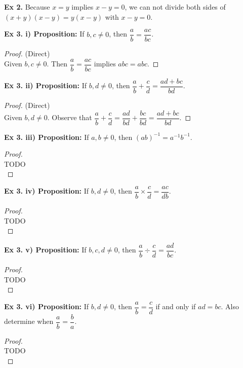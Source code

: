 \documentclass{article}
\begin{document}
	\textbf{Ex 2.} Because $x=y$ implies $x-y=0$, we can not divide both sides of $(x+y)(x-y)=y(x-y)$ with $x-y=0$.
	
	\textbf{Ex 3. i) Proposition:} If $b,c \not= 0$, then $\dfrac{a}{b}=\dfrac{ac}{bc}$.
	\begin{proof}
		(Direct)\\
		Given $b,c \not = 0$. Then $\dfrac{a}{b}=\dfrac{ac}{bc}$ implies $abc=abc$.
	\end{proof}

	\textbf{Ex 3. ii) Proposition:} If $b,d \not=0$, then $\dfrac{a}{b}+\dfrac{c}{d}=\dfrac{ad+bc}{bd}$.
	\begin{proof}
		(Direct)\\
		Given $b,d \not= 0$. Observe that $\dfrac{a}{b}+\dfrac{c}{d}=\dfrac{ad}{bd}+\dfrac{bc}{bd}=\dfrac{ad+bc}{bd}$.
	\end{proof}

	\textbf{Ex 3. iii) Proposition:} If $a,b \not=0$, then $(ab)^{-1}=a^{-1}b^{-1}$.
	\begin{proof}
		$ $\\
		TODO\\
	\end{proof}

	\textbf{Ex 3. iv) Proposition:} If $b,d \not=0$, then $\dfrac{a}{b} \times \dfrac{c}{d}=\dfrac{ac}{db}$.
	\begin{proof}
		$ $\\
		TODO\\
	\end{proof}

	\textbf{Ex 3. v) Proposition:} If $b,c,d \not=0$, then $\dfrac{a}{b} \div \dfrac{c}{d}=\dfrac{ad}{bc}$.
	\begin{proof}
		$ $\\
		TODO\\
	\end{proof}

	\textbf{Ex 3. vi) Proposition:} If $b,d \not=0$, then $\dfrac{a}{b} = \dfrac{c}{d}$ if and only if $ad=bc$. Also determine when $\dfrac{a}{b}=\dfrac{b}{a}$.
	\begin{proof}
		$ $\\
		TODO\\
	\end{proof}

	
\end{document}
